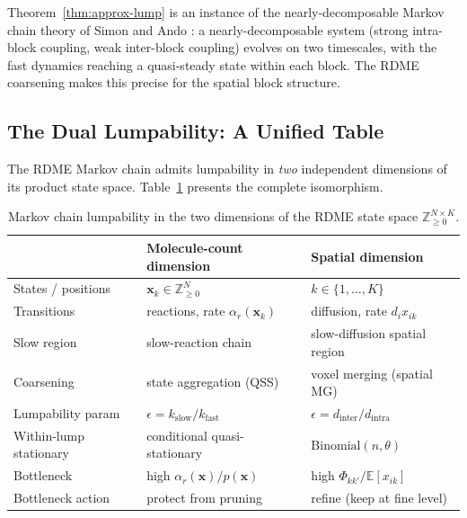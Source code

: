 \documentclass[review,onefignum,onetabnum]{siamart171218}
\newcommand{\bx}{\mathbf{x}}
\newcommand{\Znn}{\mathbb{Z}_{\geq 0}}
\newcommand{\E}{\mathbb{E}}
\begin{document}
\begin{remark}
  Theorem~\ref{thm:approx-lump} is an instance of the
  nearly-decomposable Markov chain theory of Simon and Ando
  \cite{Simon1961}: a nearly-decomposable system (strong
  intra-block coupling, weak inter-block coupling) evolves on
  two timescales, with the fast dynamics reaching a quasi-steady
  state within each block.  The RDME coarsening makes this
  precise for the spatial block structure.
\end{remark}

\subsection{The Dual Lumpability: A Unified Table}
\label{sec:dual-lump}

The RDME Markov chain admits lumpability in \emph{two}
independent dimensions of its product state space.
Table~\ref{tab:iso} presents the complete isomorphism.

\begin{table}[h]
\caption{Markov chain lumpability in the two dimensions of
  the RDME state space $\Znn^{N \times K}$.}
\label{tab:iso}
\centering
\begin{tabular}{lll}
  \hline
  & \textbf{Molecule-count dimension} & \textbf{Spatial dimension} \\
  \hline
  States / positions & $\bx_k \in \Znn^N$ & $k \in \{1,\ldots,K\}$ \\
  Transitions & reactions, rate $\alpha_r(\bx_k)$ & diffusion, rate $d_i x_{ik}$ \\
  Slow region & slow-reaction chain & slow-diffusion spatial region \\
  Coarsening & state aggregation (QSS) & voxel merging (spatial MG) \\
  Lumpability param & $\epsilon = k_{\mathrm{slow}} / k_{\mathrm{fast}}$ &
    $\epsilon = d_{\mathrm{inter}} / d_{\mathrm{intra}}$ \\
  Within-lump stationary & conditional quasi-stationary & $\mathrm{Binomial}(n, \theta)$ \\
  Bottleneck & high $\alpha_r(\bx)/p(\bx)$ & high $\Phi_{kk'}/\E[x_{ik}]$ \\
  Bottleneck action & protect from pruning \cite{Dhumuntarao2024} &
    refine (keep at fine level) \\
  \hline
\end{tabular}
\end{table}
\end{document}
